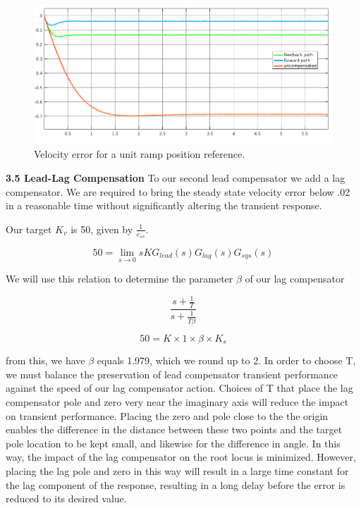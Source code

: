 \documentclass[11pt,a4paper]{article}
\begin{document}
\begin{figure}[!htbp]
	\includegraphics[width=\textwidth]{imglab/lab4sol_ramperrleadhighgain.png}
	\caption{Velocity error for a unit ramp position reference.}
\end{figure}

\textbf{3.5 Lead-Lag Compensation}
To our second lead compensator we add a lag compensator. We are required to bring the steady state velocity error below .02 in a reasonable time without significantly altering the transient response.

Our target $K_{v}$ is 50, given by $\frac{1}{e_{ss}}$.

\begin{equation}
50 = \lim_{s \to 0} s K G_{lead}(s) G_{lag}(s) G_{sys}(s)
\end{equation}

We will use this relation to determine the parameter $\beta$ of our lag compensator
\begin{center}
\begin{displaymath}
\frac{s + \frac{1}{T}}{s + \frac{1}{T \beta}}
\end{displaymath}
\end{center}

\begin{equation}
50 = K \times 1 \times \beta \times K_{s}
\end{equation}

from this, we have $\beta$ equals 1.979, which we round up to 2. In order to choose T, we must balance the preservation of lead compensator transient performance against the speed of our lag compensator action. Choices of T that place the lag compensator pole and zero very near the imaginary axis will reduce the impact on transient performance. Placing the zero and pole close to the the origin enables the difference in the distance between these two points and the target pole location to be kept small, and likewise for the difference in angle. In this way, the impact of the lag compensator on the root locus is minimized. However, placing the lag pole and zero in this way will result in a large time constant for the lag component of the response, resulting in a long delay before the error is reduced to its desired value.
\end{document}
